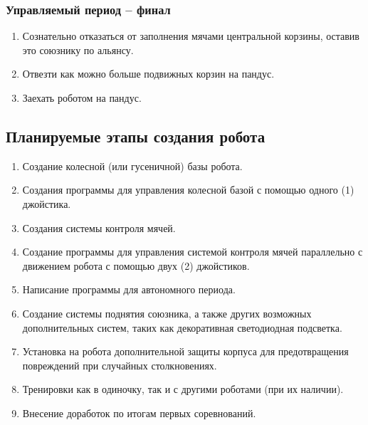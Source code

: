 \subsubsection{Управляемый период -- финал}
\begin{enumerate}
	\item Сознательно отказаться от заполнения мячами центральной корзины, оставив это союзнику по альянсу.
	\item Отвезти как можно больше подвижных корзин на пандус.
	\item Заехать роботом на пандус.
\end{enumerate}

\fillpage

\subsection{Планируемые этапы создания робота}
\begin{enumerate}
	\item Создание колесной (или гусеничной) базы робота.
	\item Создания программы для управления колесной базой с помощью одного (1) джойстика.
	\item Создания системы контроля мячей.
	\item Создание программы для управления системой контроля мячей параллельно с движением робота с помощью двух (2) джойстиков.
	\item Написание программы для автономного периода.
	\item Создание системы поднятия союзника, а также других возможных дополнительных систем, таких как декоративная светодиодная подсветка.
	\item Установка на робота дополнительной защиты корпуса для предотвращения повреждений при случайных столкновениях.
	\item Тренировки как в одиночку, так и с другими роботами (при их наличии).
	\item Внесение доработок по итогам первых соревнований.
\end{enumerate}
	
\fillpage
\newpage
